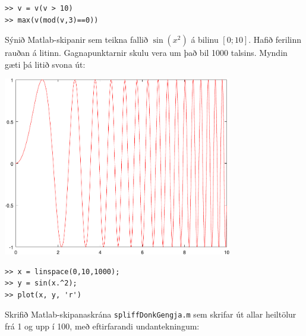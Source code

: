 \documentclass[addpoints]{exam}
\begin{document}
\begin{questions}

\begin{solution}

\begin{verbatim}
>> v = v(v > 10)
>> max(v(mod(v,3)==0))
\end{verbatim}

\end{solution}

\newpage
\question[5] Sýnið Matlab-skipanir sem teikna fallið $\sin(x^2)$ á bilinu $[0;10]$. Hafið ferilinn rauðan á litinn. Gagnapunktarnir skulu vera um það bil 1000 talsins. Myndin gæti þá litið svona út:
\begin{center}
\includegraphics[width=0.75\textwidth]{Pics/sinx2}
\end{center}

\vspace{5cm}

\begin{solution}
 
\begin{verbatim}
>> x = linspace(0,10,1000);
>> y = sin(x.^2);
>> plot(x, y, 'r')
\end{verbatim}

\end{solution}

\newpage
\question[10] Skrifið Matlab-skipanaskrána \texttt{spliffDonkGengja.m} sem skrifar út allar heiltölur frá 1 og upp í 100, með eftirfarandi undantekningum:


\end{questions}
\end{document}

